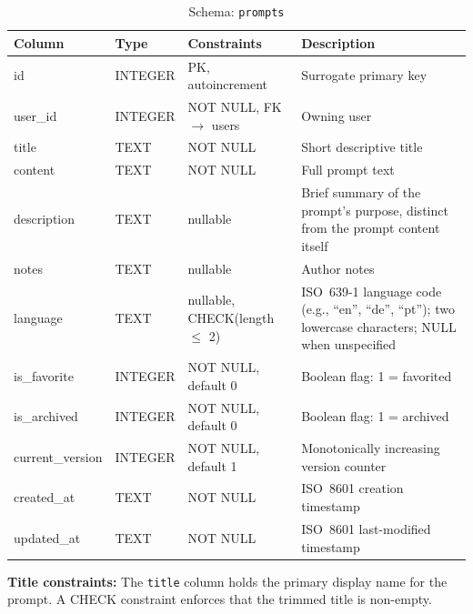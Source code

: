\documentclass[a4paper, 11pt, oneside]{report}
\begin{document}
\begin{table}[H]
  \centering
  \caption{Schema: \texttt{prompts}}
  \label{tab:schema-prompts}
  \begin{tabularx}{\textwidth}{l l l X}
    \toprule
    \textbf{Column} & \textbf{Type} & \textbf{Constraints} & \textbf{Description} \\
    \midrule
    id               & INTEGER & PK, autoincrement        & Surrogate primary key \\
    user\_id         & INTEGER & NOT NULL, FK $\to$ users  & Owning user \\
    title            & TEXT    & NOT NULL                  & Short descriptive title \\
    content          & TEXT    & NOT NULL                  & Full prompt text \\
    description      & TEXT    & nullable                  & Brief summary of the prompt's purpose,
                                                            distinct from the prompt content itself \\
    notes            & TEXT    & nullable                  & Author notes \\
    language         & TEXT    & nullable, CHECK(length $\leq$ 2)  & ISO~639-1 language code
                                                            (e.g., ``en'', ``de'', ``pt'');
                                                            two lowercase characters;
                                                            NULL when unspecified \\
    is\_favorite     & INTEGER & NOT NULL, default 0       & Boolean flag: 1 = favorited \\
    is\_archived     & INTEGER & NOT NULL, default 0       & Boolean flag: 1 = archived \\
    current\_version & INTEGER & NOT NULL, default 1       & Monotonically increasing version counter \\
    created\_at      & TEXT    & NOT NULL                  & ISO~8601 creation timestamp \\
    updated\_at      & TEXT    & NOT NULL                  & ISO~8601 last-modified timestamp \\
    \bottomrule
  \end{tabularx}
\end{table}

\textbf{Title constraints:} The \texttt{title} column holds the primary
display name for the prompt.  A CHECK constraint enforces that the
trimmed title is non-empty.
\end{document}
